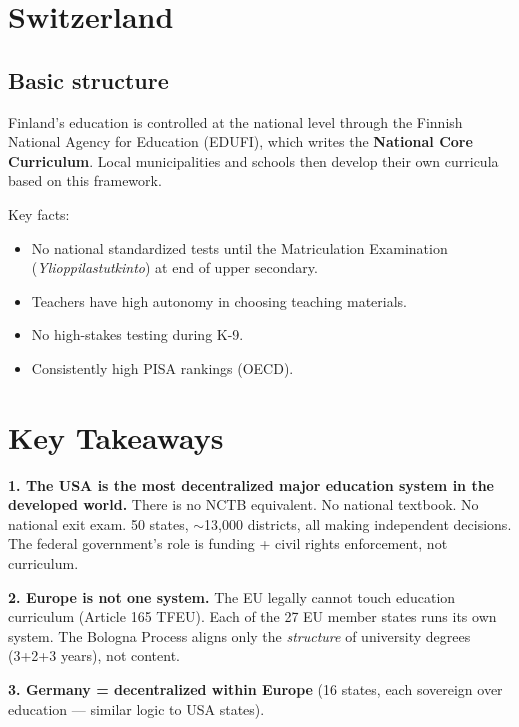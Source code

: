 
\chapter{Switzerland}


\section{Basic structure}

Finland's education is controlled at the national level through the Finnish National Agency for Education (EDUFI), which writes the \textbf{National Core Curriculum}. Local municipalities and schools then develop their own curricula based on this framework.

Key facts:
\begin{itemize}
	\item No national standardized tests until the Matriculation Examination (\textit{Ylioppilastutkinto}) at end of upper secondary.
	\item Teachers have high autonomy in choosing teaching materials.
	\item No high-stakes testing during K-9.
	\item Consistently high PISA rankings (OECD).
\end{itemize}





\chapter{Key Takeaways}


\textbf{1. The USA is the most decentralized major education system in the developed world.} There is no NCTB equivalent. No national textbook. No national exit exam. 50 states, $\sim$13,000 districts, all making independent decisions. The federal government's role is funding + civil rights enforcement, not curriculum.

\textbf{2. Europe is not one system.} The EU legally cannot touch education curriculum (Article 165 TFEU). Each of the 27 EU member states runs its own system. The Bologna Process aligns only the \textit{structure} of university degrees (3+2+3 years), not content.

\textbf{3. Germany = decentralized within Europe} (16 states, each sovereign over education --- similar logic to USA states).

